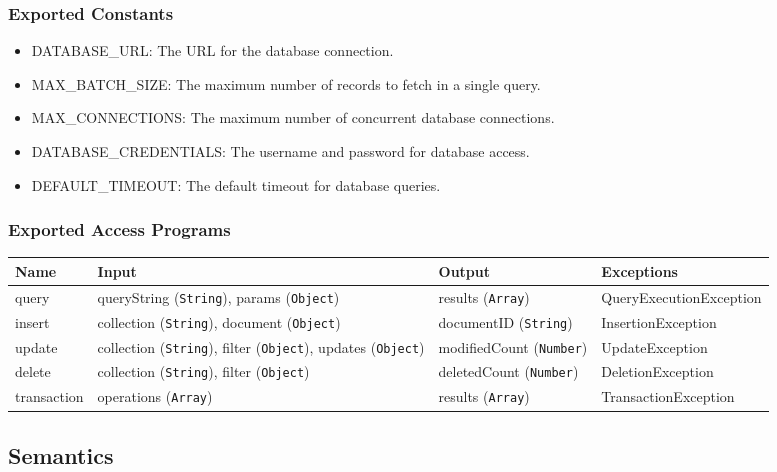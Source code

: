 \documentclass[12pt, titlepage]{article}
\begin{document}
\subsubsection{Exported Constants}
\begin{itemize}
    \item DATABASE\_URL: The URL for the database connection.
    \item MAX\_BATCH\_SIZE: The maximum number of records to fetch in a single query.
    \item MAX\_CONNECTIONS: The maximum number of concurrent database connections.
    \item DATABASE\_CREDENTIALS: The username and password for database access.
    \item DEFAULT\_TIMEOUT: The default timeout for database queries.
\end{itemize}

\subsubsection{Exported Access Programs}
\begin{center}
    \begin{tabular}{|p{3cm}|p{4cm}|p{4cm}|p{4cm}|}
        \hline
        \textbf{Name} & \textbf{Input} & \textbf{Output} & \textbf{Exceptions} \\
        \hline
        query & queryString (\texttt{String}), params (\texttt{Object}) & results (\texttt{Array}) & QueryExecutionException \\
        \hline
        insert & collection (\texttt{String}), document (\texttt{Object}) & documentID (\texttt{String}) & InsertionException \\
        \hline
        update & collection (\texttt{String}), filter (\texttt{Object}), updates (\texttt{Object}) & modifiedCount (\texttt{Number}) & UpdateException \\
        \hline
        delete & collection (\texttt{String}), filter (\texttt{Object}) & deletedCount (\texttt{Number}) & DeletionException \\
        \hline
        transaction & operations (\texttt{Array}) & results (\texttt{Array}) & TransactionException \\
        \hline
    \end{tabular}
\end{center}

\subsection{Semantics}
\end{document}
